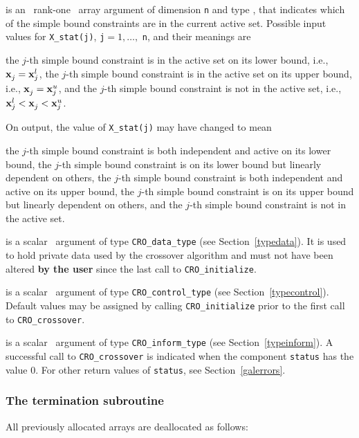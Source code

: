 \documentclass{galahad}
\newcommand{\packagename}{CRO}
\begin{document}
\begin{description}
 is an \intentin\ rank-one \intentinout\ array argument of
dimension {\tt n}
and type \integer, that indicates which of the simple bound
constraints are in the current active set. Possible input values for
{\tt X\_stat(j)}, {\tt j}$=1, \ldots ,$ {\tt n}, and their meanings are
\begin{description}
 the $j$-th simple bound constraint
is in the active set on its lower bound, i.e., ${\mathbf{x}}_j^{} = {\mathbf{x}}_j^{l}$,
 the $j$-th simple bound constraint
is in the active set on its upper bound, i.e., ${\mathbf{x}}_j^{} = {\mathbf{x}}_j^{u}$,
and
  the $j$-th simple bound constraint is not in the active set,
i.e., ${\mathbf{x}}_j^{l} < {\mathbf{x}}_j^{} < {\mathbf{x}}_j^{u}$.
\end{description}
On output, the value of {\tt X\_stat(j)} may have changed to mean
\begin{description}
 the $j$-th simple bound constraint
is both independent and active on its lower bound,
 the $j$-th simple bound constraint
is on its lower bound but linearly dependent on others,
 the $j$-th simple bound constraint
is both independent and active on its upper bound,
 the $j$-th simple bound constraint
is on its upper bound but linearly dependent on others, and
 the $j$-th simple bound constraint is not in the active set.
\end{description}

 is a scalar \intentinout\ argument of type
{\tt \packagename\_data\_type}
(see Section~\ref{typedata}).
It is used to hold private data used by the crossover algorithm
and must not have been altered {\bf by the user} since the last call to
{\tt \packagename\_initialize}.

 is a scalar \intentin\ argument of type
{\tt \packagename\_control\_type}
(see Section~\ref{typecontrol}). Default values may be assigned by calling
{\tt \packagename\_initialize} prior to the first call to
{\tt \packagename\_crossover}.

 is a scalar \intentinout\ argument of type
{\tt \packagename\_inform\_type}
(see Section~\ref{typeinform}).
A successful call to
{\tt \packagename\_crossover}
is indicated when the  component {\tt status} has the value 0.
For other return values of {\tt status}, see Section~\ref{galerrors}.

\end{description}


\subsubsection{The  termination subroutine}
All previously allocated arrays are deallocated as follows:
\vspace*{1mm}
\end{document}
